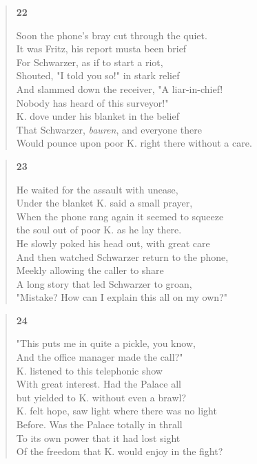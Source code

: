 \documentclass{article}
\begin{document}
\begin{verse}
  \begin{center}
    \textbf{22} \\
  \end{center}
  Soon the phone's bray cut through the quiet. \\
  It was Fritz, his report musta been brief \\
  For Schwarzer, as if to start a riot, \\
  Shouted, "I told you so!" in stark relief \\
  And slammed down the receiver, "A liar-in-chief! \\
  Nobody has heard of this surveyor!" \\
  K. dove under his blanket in the belief \\
  That Schwarzer, \textit{bauren}, and everyone there \\
  Would pounce upon poor K. right there without a care.
\end{verse}

\begin{verse}
  \begin{center}
    \textbf{23} \\
  \end{center}
  He waited for the assault with unease, \\
  Under the blanket K. said a small prayer, \\
  When the phone rang again it seemed to squeeze \\
  the soul out of poor K. as he lay there. \\
  He slowly poked his head out, with great care \\
  And then watched Schwarzer return to the phone, \\
  Meekly allowing the caller to share \\
  A long story that led Schwarzer to groan, \\
  "Mistake? How can I explain this all on my own?"
\end{verse}

\newpage

\begin{verse}
  \begin{center}
    \textbf{24} \\
  \end{center}
"This puts me in quite a pickle, you know, \\
And the office manager made the call?" \\
K. listened to this telephonic show \\
With great interest. Had the Palace all \\
but yielded to K. without even a brawl? \\
K. felt hope, saw light where there was no light \\
Before. Was the Palace totally in thrall \\
To its own power that it had lost sight \\
Of the freedom that K. would enjoy in the fight?
\end{verse}
\end{document}
